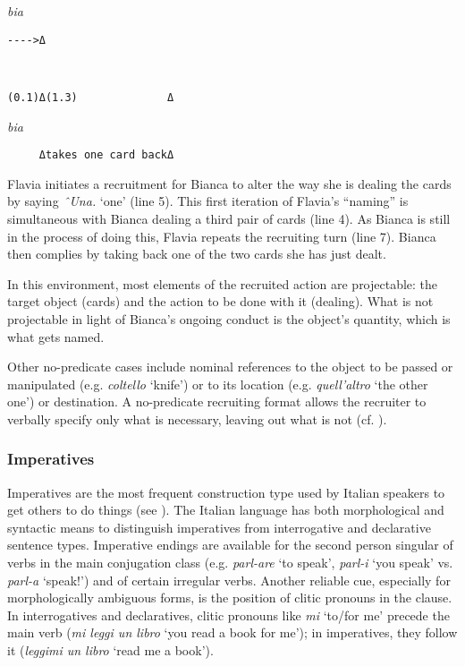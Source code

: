 \documentclass[output=paper,modfonts]{langscibook}
\begin{document}
%
\begin{transbox}{8}{\textit{bia}}
\begin{verbatim}
---->Δ
\end{verbatim}
\end{transbox}
%
\begin{transbox}{9}{~}
\begin{verbatim}
(0.1)Δ(1.3)              Δ
\end{verbatim}
\end{transbox}\vspace{-1mm}
%
\begin{mdframednoverticalspace}[style=secondfoc]
\begin{transbox}{10}{\textit{bia}}
\begin{verbatim}
     Δtakes one card backΔ
\end{verbatim}
\end{transbox}
\end{mdframednoverticalspace}

Flavia initiates a recruitment for Bianca to alter the way she is dealing the cards by saying \textit{ˆUna.} ‘one’ (line 5). This first iteration of Flavia's “naming” is simultaneous with Bianca dealing a third pair of cards (line 4). As Bianca is still in the process of doing this, Flavia repeats the recruiting turn (line 7). Bianca then complies by taking back one of the two cards she has just dealt.

In this environment, most elements of the recruited action are projectable: the target object (cards) and the action to be done with it (dealing). What is not projectable in light of Bianca's ongoing conduct is the object's quantity, which is what gets named.

Other no-predicate cases include nominal references to the object to be passed or manipulated (e.g. \textit{coltello} ‘knife’) or to its location (e.g. \textit{quell'altro} ‘the other one’) or destination. A no-predicate recruiting format allows the recruiter to verbally specify only what is necessary, leaving out what is not (cf. \citealt{Mondada2011,Mondada2014b,SorjonenRaevaara2014}).

\subsubsection{Imperatives}\label{sec:rossi:3.3.2}

Imperatives are the most frequent construction type used by Italian speakers to get others to do things (see ). The Italian language has both morphological and syntactic means to distinguish imperatives from interrogative and declarative sentence types. Imperative endings are available for the second person singular of verbs in the main conjugation class (e.g. \textit{parl-are} ‘to speak’, \textit{parl-i} ‘you speak’ vs. \textit{parl-a} ‘speak!’) and of certain irregular verbs. Another reliable cue, especially for morphologically ambiguous forms, is the position of clitic pronouns in the clause. In interrogatives and declaratives, clitic pronouns like \textit{mi} ‘to/for me’ precede the main verb (\textit{mi leggi un libro} ‘you read a book for me’); in imperatives, they follow it (\textit{leggimi un libro} ‘read me a book’).
\end{document}
